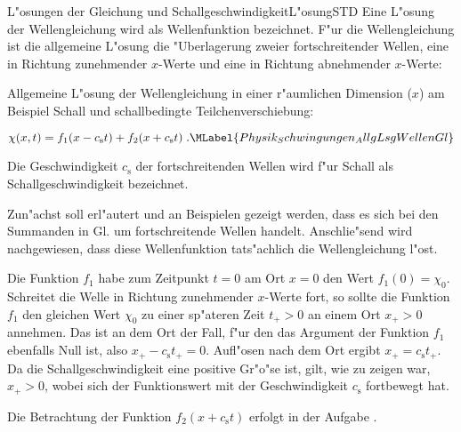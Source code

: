 \begin{MXContent}{L"osungen der Gleichung und Schallgeschwindigkeit}{L"osung}{STD}%
Eine L"osung der Wellengleichung wird als Wellenfunktion bezeichnet. F"ur die Wellengleichung  ist die allgemeine L"osung die "Uberlagerung zweier fortschreitender Wellen, eine in Richtung zunehmender $x$-Werte und eine in Richtung abnehmender $x$-Werte:

\begin{MInfo}
Allgemeine L"osung der Wellengleichung  in einer r"aumlichen Dimension ($x$) am Beispiel Schall und schallbedingte Teilchenverschiebung:

\begin{equation}
  \chi(x,t) = f_1(x-c_\mathrm{s}t)+f_2(x+c_\mathrm{s}t)\; . \MLabel{Physik_Schwingungen_AllgLsgWellenGl}
\end{equation}

Die Geschwindigkeit $c_\mathrm{s}$ der fortschreitenden Wellen wird f"ur Schall als Schallgeschwindigkeit bezeichnet.
\end{MInfo}

Zun"achst soll erl"autert und an Beispielen gezeigt werden, dass es sich bei den Summanden in Gl.  um fortschreitende Wellen handelt. Anschlie"send wird nachgewiesen, dass diese Wellenfunktion tats"achlich die Wellengleichung l"ost.

Die Funktion $f_1$ habe zum Zeitpunkt $t=0$ am Ort $x=0$ den Wert $f_1(0)=\chi_0$. Schreitet die Welle in Richtung zunehmender $x$-Werte fort, so sollte die Funktion $f_1$ den gleichen Wert $\chi_0$ zu einer sp"ateren Zeit $t_+>0$ an einem Ort $x_+>0$ annehmen. Das ist an dem Ort der Fall, f"ur den das Argument der Funktion $f_1$ ebenfalls Null ist, also $x_+-c_\mathrm{s}t_+=0$. Aufl"osen nach dem Ort ergibt $x_+=c_\mathrm{s}t_+$. Da die Schallgeschwindigkeit eine positive Gr"o"se ist, gilt, wie zu zeigen war, $x_+>0$, wobei sich der Funktionswert mit der Geschwindigkeit $c_\mathrm{s}$ fortbewegt hat.

Die Betrachtung der Funktion $f_2(x+c_\mathrm{s}t)$ erfolgt in der Aufgabe 
.


\end{MXContent}
